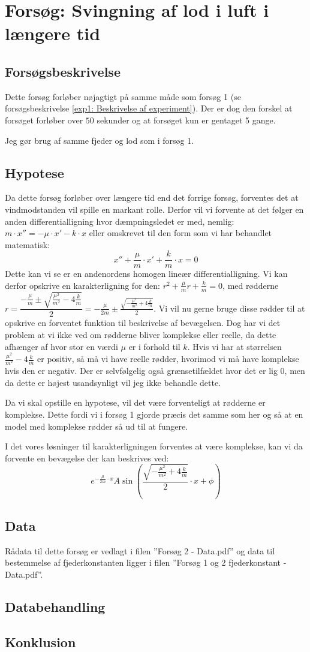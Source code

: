 \section{Forsøg: Svingning af lod i luft i længere tid}

\subsection{Forsøgsbeskrivelse}
Dette forsøg forløber nøjagtigt på samme måde som forsøg 1 (se forsøgsbeskrivelse \ref{exp1: Beskrivelse af experiment}).
Der er dog den forskel at forsøget forløber over $50$ sekunder og at forsøget kun er gentaget 5 gange. 

Jeg gør brug af samme fjeder og lod som i forsøg 1.

\subsection{Hypotese}
Da dette forsøg forløber over længere tid end det forrige forsøg, forventes det at vindmodstanden vil spille en markant rolle. 
Derfor vil vi forvente at det følger en anden differentialligning hvor dæmpningsledet er med, nemlig:
$m\cdot x''= -\mu \cdot x' - k\cdot x$
eller omskrevet til den form som vi har behandlet matematisk:
$$x''+ \frac{\mu}{m} \cdot x' + \frac{k}{m}\cdot x=0$$
Dette kan vi  se er en andenordens homogen lineær differentialligning.
Vi kan derfor opskrive en karakterligning for den:
$r^2 + \frac{\mu}{m} r + \frac{k}{m} = 0$, med rødderne $r = \dfrac{-\frac{\mu}{m} \pm \sqrt{\frac{\mu^2}{m^2}-4\frac{k}{m}}}{2}=
-\frac{\mu}{2m}  \pm   \frac{\sqrt{-\frac{\mu^2}{m^2}+4\frac{k}{m}}}{2}$.
Vi vil nu gerne bruge disse rødder til at opskrive en forventet funktion til beskrivelse af bevægelsen. 
Dog har vi det problem at vi ikke ved om rødderne bliver komplekse eller reelle, da dette afhænger af hvor stor en værdi $\mu$ er i forhold til $k$.
Hvis vi har at størrelsen $\frac{\mu^2}{m^2}-4\frac{k}{m}$ er positiv, så må vi have reelle rødder, hvorimod vi må have komplekse hvis den er negativ. 
Der er selvfølgelig også grænsetilfældet hvor det er lig $0$, men da dette er højest usandsynligt vil jeg ikke behandle dette. 

Da vi skal opstille en hypotese, vil det være forventeligt at rødderne er komplekse. 
Dette fordi vi i forsøg 1 gjorde præcis det samme som her og så at en model med komplekse rødder så ud til at fungere. 

I det vores løsninger til karakterligningen forventes at være komplekse, kan vi da forvente en bevægelse der kan beskrives ved:
$$e^{-\frac{\mu}{2m} \cdot x}A\sin(\frac{\sqrt{-\frac{\mu^2}{m^2}+4\frac{k}{m}}}{2} \cdot x+\phi)$$
\subsection{Data}
Rådata til dette forsøg er vedlagt i filen ''Forsøg 2 - Data.pdf'' og data til bestemmelse af fjederkonstanten ligger i filen ''Forsøg 1 og 2 fjederkonstant - Data.pdf''. 


\subsection{Databehandling}

\subsection{Konklusion}


